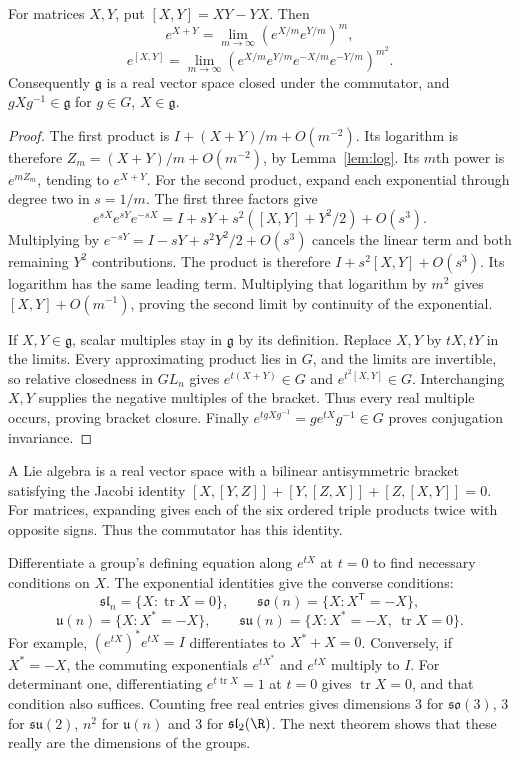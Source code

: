 \begin{proposition}\label{prop:liealgebra}
For matrices $X,Y$, put $[X,Y]=XY-YX$. Then
\[
 e^{X+Y}=\lim_{m\to\infty}(e^{X/m}e^{Y/m})^m,
\]
\[
 e^{[X,Y]}=\lim_{m\to\infty}
 (e^{X/m}e^{Y/m}e^{-X/m}e^{-Y/m})^{m^2}.
\]
Consequently $\mathfrak g$ is a real vector space closed under the
commutator, and $gXg^{-1}\in\mathfrak g$ for $g\in G$, $X\in\mathfrak g$.
\end{proposition}
\begin{proof}
The first product is
$I+(X+Y)/m+O(m^{-2})$. Its logarithm is therefore
$Z_m=(X+Y)/m+O(m^{-2})$, by Lemma~\ref{lem:log}.
Its $m$th power is $e^{mZ_m}$, tending to $e^{X+Y}$.
For the second product, expand each exponential through degree two in
$s=1/m$. The first three factors give
\[
 e^{sX}e^{sY}e^{-sX}
 =I+sY+s^2([X,Y]+Y^2/2)+O(s^3).
\]
Multiplying by $e^{-sY}=I-sY+s^2Y^2/2+O(s^3)$ cancels the linear
term and both remaining $Y^2$ contributions. The product is therefore
$I+s^2[X,Y]+O(s^3)$. Its logarithm has the same leading term.
Multiplying that logarithm by $m^2$ gives $[X,Y]+O(m^{-1})$, proving
the second limit by continuity of the exponential.

If $X,Y\in\mathfrak g$, scalar multiples stay in $\mathfrak g$ by its
definition. Replace $X,Y$ by $tX,tY$ in the limits.
Every approximating product lies in $G$, and the limits are invertible,
so relative closedness in $GL_n$ gives
$e^{t(X+Y)}\in G$ and $e^{t^2[X,Y]}\in G$.
Interchanging $X,Y$ supplies the negative multiples of the bracket.
Thus every real multiple occurs, proving bracket closure.
Finally $e^{tgXg^{-1}}=ge^{tX}g^{-1}\in G$ proves conjugation invariance.
\end{proof}

A Lie algebra is a real vector space with a bilinear antisymmetric bracket
satisfying the Jacobi identity
$[X,[Y,Z]]+[Y,[Z,X]]+[Z,[X,Y]]=0$.
For matrices, expanding gives each of the six ordered triple products
twice with opposite signs. Thus the commutator has this identity.

Differentiate a group's defining equation along $e^{tX}$ at $t=0$ to
find necessary conditions on $X$. The exponential identities give the
converse conditions:
\[
 \mathfrak{sl}_n=\{X:\operatorname{tr}X=0\},\qquad
 \mathfrak{so}(n)=\{X:X^{\mathsf T}=-X\},
\]
\[
 \mathfrak u(n)=\{X:X^*=-X\},\qquad
 \mathfrak{su}(n)=\{X:X^*=-X,\ \operatorname{tr}X=0\}.
\]
For example, $(e^{tX})^*e^{tX}=I$ differentiates to $X^*+X=0$.
Conversely, if $X^*=-X$, the commuting exponentials $e^{tX^*}$ and
$e^{tX}$ multiply to $I$.
For determinant one, differentiating $e^{t\operatorname{tr}X}=1$
at $t=0$ gives $\operatorname{tr}X=0$, and that condition also suffices.
Counting free real entries gives dimensions $3$ for $\mathfrak{so}(3)$,
$3$ for $\mathfrak{su}(2)$, $n^2$ for $\mathfrak u(n)$ and $3$ for
$\mathfrak{sl}_2(\R)$.
The next theorem shows that these really are the dimensions of the groups.

